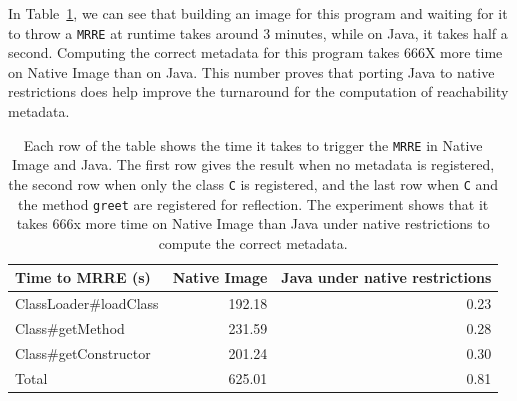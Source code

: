 In Table~\ref{tab:benchmark}, we can see that building an image for this program and waiting for it to throw a \verb|MRRE| at runtime takes around 3 minutes, while on Java, it takes half a second. Computing the correct metadata for this program takes 666X more time on Native Image than on Java.
This number proves that porting Java to native restrictions does help improve the turnaround for the computation of reachability metadata.

\begin{table}[ht]
\centering
\begin{tabular}{@{}lrr@{}}
\toprule
Time to MRRE (s) & \multicolumn{1}{l}{Native Image} & \multicolumn{1}{l}{Java under native restrictions} \\ \midrule
ClassLoader\#loadClass          & 192.18 & 0.23 \\
Class\#getMethod                & 231.59 & 0.28 \\
Class\#getConstructor           & 201.24 & 0.30 \\ \midrule
Total                           & 625.01 & 0.81 \\ \bottomrule
\end{tabular}
\caption{Each row of the table shows the time it takes to trigger the \texttt{MRRE} in Native Image and Java. The first row gives the result when no metadata is registered, the second row when only the class \texttt{C} is registered, and the last row when \texttt{C} and the method \texttt{greet} are registered for reflection. The experiment shows that it takes 666x more time on Native Image than Java under native restrictions to compute the correct metadata.}
\label{tab:benchmark}
\end{table}
